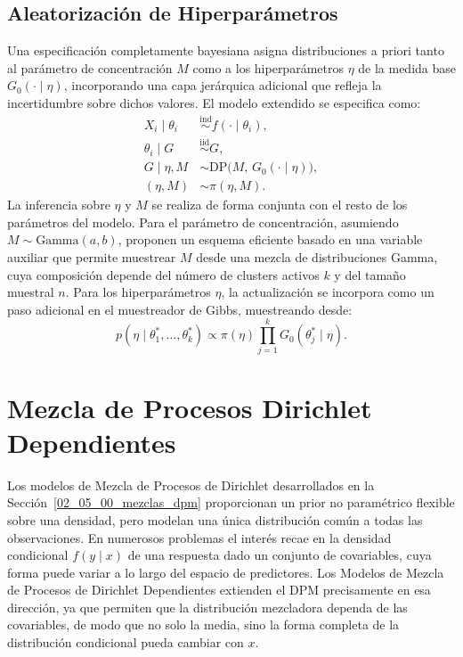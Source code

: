 \subsection{Aleatorización de Hiperparámetros}
\label{02_05_04_hiperparametros}
Una especificación completamente bayesiana asigna distribuciones a priori tanto al parámetro de concentración $M$ como a los hiperparámetros $\eta$ de la medida base $G_0(\cdot \mid \eta)$, incorporando una capa jerárquica adicional que refleja la incertidumbre sobre dichos valores. El modelo extendido se especifica como:
\begin{equation}
\begin{aligned}
    X_i \mid \theta_i &\overset{\mathrm{ind}}{\sim} f(\cdot \mid \theta_i), \\
    \theta_i \mid G &\overset{\mathrm{iid}}{\sim} G, \\
    G \mid \eta, M &\sim \mathrm{DP}\bigl(M,\, G_0(\cdot \mid \eta)\bigr), \\
    (\eta, M) &\sim \pi(\eta, M).
\end{aligned}
\end{equation}
La inferencia sobre $\eta$ y $M$ se realiza de forma conjunta con el resto de los parámetros del modelo. Para el parámetro de concentración, asumiendo $M \sim \mathrm{Gamma}(a, b)$, \cite{02_05_escobar1995bayesian} proponen un esquema eficiente basado en una variable auxiliar que permite muestrear $M$ desde una mezcla de distribuciones Gamma, cuya composición depende del número de clusters activos $k$ y del tamaño muestral $n$. Para los hiperparámetros $\eta$, la actualización se incorpora como un paso adicional en el muestreador de Gibbs, muestreando desde:
\begin{equation}
    p(\eta \mid \theta_1^*, \dots, \theta_k^*) \propto
    \pi(\eta) \prod_{j=1}^{k} G_0(\theta_j^* \mid \eta).
\end{equation}

\section{Mezcla de Procesos Dirichlet Dependientes}
\label{02_06_00_mezcla_ddp}
Los modelos de Mezcla de Procesos de Dirichlet desarrollados en la Sección~\ref{02_05_00_mezclas_dpm} proporcionan un prior no paramétrico flexible sobre una densidad, pero modelan una única distribución común a todas las observaciones. En numerosos problemas el interés recae en la densidad condicional $f(y \mid x)$ de una respuesta dado un conjunto de covariables, cuya forma puede variar a lo largo del espacio de predictores. Los Modelos de Mezcla de Procesos de Dirichlet Dependientes extienden el DPM precisamente en esa dirección, ya que permiten que la distribución mezcladora dependa de las covariables, de modo que no solo la media, sino la forma completa de la distribución condicional pueda cambiar con $x$.\\

